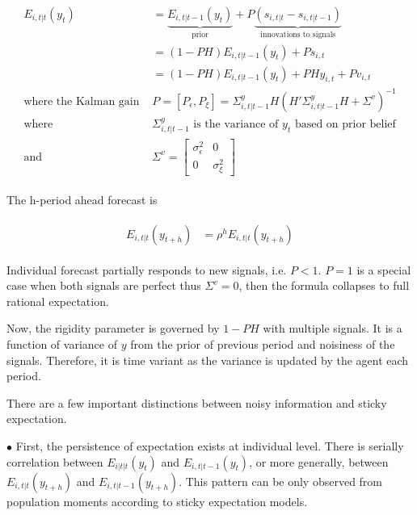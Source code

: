 \documentclass[]{article}
\begin{document}
\begin{eqnarray}
\begin{aligned}
E_{i,t|t}(y_{t}) 
& =  \underbrace{E_{i,t|t-1}(y_{t})}_{\text{prior}} + P \underbrace {(s_{i,t|t}-s_{i,t|t-1})}_{\text{innovations to signals}} \\
& = (1-PH) E_{i,t|t-1}(y_{t}) + Ps_{i,t} \\
& = (1-PH) E_{i,t|t-1}(y_{t}) + PH y_{i,t} + P v_{i,t} \\
\text{where the Kalman gain }  & P = [P_\epsilon,P_\xi]= \Sigma^y_{i,t|t-1} H(H'\Sigma^y_{i,t|t-1} H + \Sigma^v)^{-1} \\
\text {where } & \Sigma^y_{i,t|t-1} \text{ is the variance of } y_t \text{ based on prior belief}\\
\text {and } & \Sigma^v =  \left[ \begin{matrix} 
  \sigma^2_{\epsilon} &  0 \\ 0 & \sigma^2_\xi \end{matrix}\right] 
\end{aligned}
\end{eqnarray}

The h-period ahead forecast is 

\begin{eqnarray}
\begin{aligned}
E_{i,t|t}(y_{t+h}) & = \rho^{h}E_{i,t|t}(y_{t+h}) 
\end{aligned}
\end{eqnarray}


Individual forecast partially responds to new signals, i.e. $P<1$. $P=1$ is a special case when both signals are perfect thus $\Sigma^v = 0$, then the formula collapses to full rational expectation. 

Now, the rigidity parameter is governed by $1-PH$ with multiple signals. It is a function of variance of $y$ from the prior of previous period and noisiness of the signals. Therefore, it is time variant as the variance is updated by the agent each period.  


There are a few important distinctions between noisy information and sticky expectation. 

$\bullet$  First, the persistence of expectation exists at individual level. There is serially correlation between $E_{i|t|t}(y_t)$ and $E_{i,t|t-1}(y_{t})$, or more generally, between $E_{i,t|t}(y_{t+h})$ and $E_{i,t|t-1}(y_{t+h})$. This pattern can be only observed from population moments according to sticky expectation models. 
\end{document}
